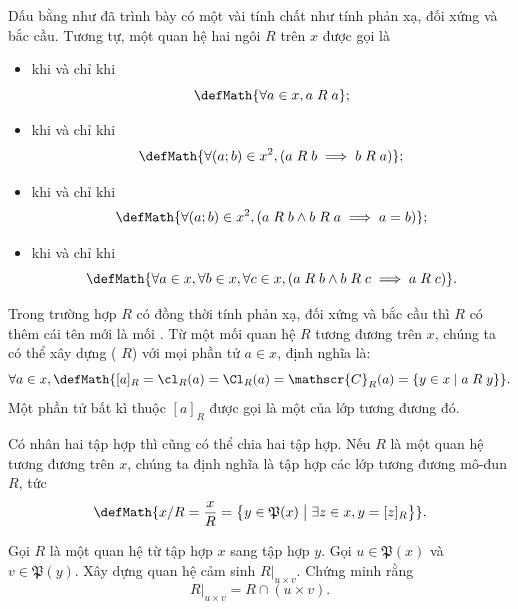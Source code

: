 Dấu bằng như đã trình bày có một vài tính chất như tính phản xạ, đối xứng và bắc cầu. Tương tự, một quan hệ hai ngôi $R$ trên $x$ được gọi là
\begin{itemize}
   \item {} khi và chỉ khi $$
      \defMath{\forall a \in x, a\;R\;a};
   $$
   \item {} khi và chỉ khi \begin{equation*}
      \defMath{\forall (a; b) \in x^2, (a\;R\;b \implies b\;R\;a)};
   \end{equation*}
   \item {} khi và chỉ khi \begin{equation*}
      \defMath{\forall (a; b) \in x^2, (a\;R\;b \land b\;R\;a \implies a = b)};
   \end{equation*}
   \item {} khi và chỉ khi \begin{equation*}
      \defMath{\forall a \in x, \forall b \in x, \forall c \in x, (a\;R\;b \land b\;R\;c \implies a\;R\;c)}.
   \end{equation*}
\end{itemize}
Trong trường hợp $R$ có đồng thời tính phản xạ, đối xứng và bắc cầu thì $R$ có thêm cái tên mới là mối . Từ một mối quan hệ $R$ tương đương trên $x$, chúng ta có thể xây dựng  ( $R$) với mọi phần tử $a \in x$, định nghĩa là:
\begin{equation*}
   \forall a \in x, \defMath{[a]_R = \cl_R(a) = \Cl_R(a) = \mathscr{C}_R(a) = \{ 
      y \in x \mid a\;R\;y
   \}}.
\end{equation*}
Một phần tử bất kì thuộc $[a]_R$ được gọi là một  của lớp tương đương đó.

Có nhân hai tập hợp thì cũng có thể chia hai tập hợp. Nếu $R$ là một quan hệ tương đương trên $x$, chúng ta định nghĩa  là tập hợp các lớp tương đương mô-đun $R$, tức \begin{equation*}
   \defMath{x/R = \frac{x}{R} = \big\{y \in \mathfrak{P}(x)\;\big|\;\exists z \in x, y = [z]_R\big\}}.
\end{equation*}

\exercise Gọi $R$ là một quan hệ từ tập hợp $x$ sang tập hợp $y$. Gọi $u \in \mathfrak{P}(x)$ và $v \in \mathfrak{P}(y)$. Xây dựng quan hệ cảm sinh $R|_{u \times v}$. Chứng minh rằng
\begin{equation*}
   R|_{u \times v} = R \cap (u \times v).
\end{equation*}

